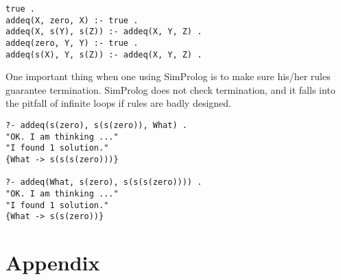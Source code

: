 \documentclass{article}
\begin{document}
\begin{verbatim}
true .
addeq(X, zero, X) :- true .
addeq(X, s(Y), s(Z)) :- addeq(X, Y, Z) .
addeq(zero, Y, Y) :- true .
addeq(s(X), Y, s(Z)) :- addeq(X, Y, Z) .
\end{verbatim}

One important thing when one using SimProlog is to make sure his/her rules guarantee termination. SimProlog does not check termination, and it falls into the pitfall of infinite loops if rules are badly designed.

\begin{verbatim}
?- addeq(s(zero), s(s(zero)), What) .
"OK. I am thinking ..."
"I found 1 solution."
{What -> s(s(s(zero)))}

?- addeq(What, s(zero), s(s(s(zero)))) .
"OK. I am thinking ..."
"I found 1 solution."
{What -> s(s(zero))}
\end{verbatim}

\section*{Appendix}
\end{document}
